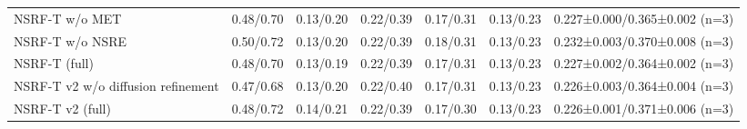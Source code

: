 \begin{tabular}{lcccccc}
NSRF-T w/o MET & 0.48/0.70 & 0.13/0.20 & 0.22/0.39 & 0.17/0.31 & 0.13/0.23 & 0.227±0.000/0.365±0.002 (n=3) \\
NSRF-T w/o NSRE & 0.50/0.72 & 0.13/0.20 & 0.22/0.39 & 0.18/0.31 & 0.13/0.23 & 0.232±0.003/0.370±0.008 (n=3) \\
NSRF-T (full) & 0.48/0.70 & 0.13/0.19 & 0.22/0.39 & 0.17/0.31 & 0.13/0.23 & 0.227±0.002/0.364±0.002 (n=3) \\
NSRF-T v2 w/o diffusion refinement & 0.47/0.68 & 0.13/0.20 & 0.22/0.40 & 0.17/0.31 & 0.13/0.23 & 0.226±0.003/0.364±0.004 (n=3) \\
NSRF-T v2 (full) & 0.48/0.72 & 0.14/0.21 & 0.22/0.39 & 0.17/0.30 & 0.13/0.23 & 0.226±0.001/0.371±0.006 (n=3) \\
\bottomrule\end{tabular}